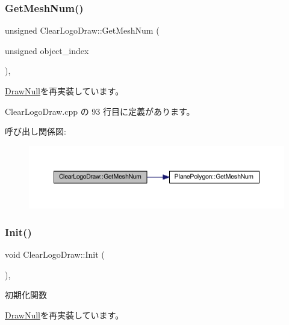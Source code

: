 \subsubsection{\texorpdfstring{Get\+Mesh\+Num()}{GetMeshNum()}}
{\footnotesize\ttfamily unsigned Clear\+Logo\+Draw\+::\+Get\+Mesh\+Num (\begin{DoxyParamCaption}\item[{unsigned}]{object\+\_\+index }\end{DoxyParamCaption})\hspace{0.3cm}{\ttfamily [override]}, {\ttfamily [virtual]}}



\mbox{\hyperlink{class_draw_null_ad735978a85a5f3583eecd82d6bfe6413}{Draw\+Null}}を再実装しています。



 Clear\+Logo\+Draw.\+cpp の 93 行目に定義があります。

呼び出し関係図\+:\nopagebreak
\begin{figure}[H]
\begin{center}
\leavevmode
\includegraphics[width=350pt]{class_clear_logo_draw_a99aba47b4693f15498daf7df2bfee2d7_cgraph}
\end{center}
\end{figure}
\mbox{\label{class_clear_logo_draw_a9af656c0a8ebfb5fa133a0983add6ffd}} 
\subsubsection{\texorpdfstring{Init()}{Init()}}
{\footnotesize\ttfamily void Clear\+Logo\+Draw\+::\+Init (\begin{DoxyParamCaption}{ }\end{DoxyParamCaption})\hspace{0.3cm}{\ttfamily [override]}, {\ttfamily [virtual]}}



初期化関数 



\mbox{\hyperlink{class_draw_null_acd7fef3ccea1da537ac9507ffbb6dd2e}{Draw\+Null}}を再実装しています。



